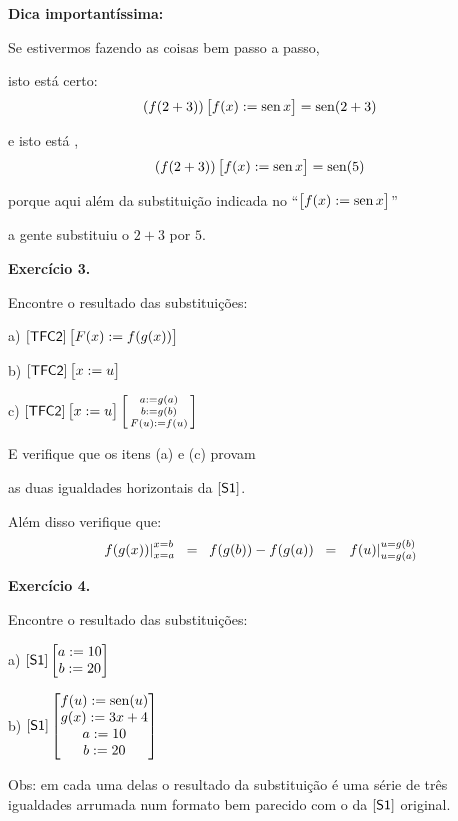 \documentclass[oneside,12pt]{article}
\begin{document}
{\bf Dica importantíssima:}

Se estivermos fazendo as coisas bem passo a passo,

isto está certo:
%
$$(f(2+3)) \Subst{f(x):=\sen x} = \sen(2+3)$$

e isto está ,
%
$$(f(2+3)) \Subst{f(x):=\sen x} = \sen(5)$$

porque aqui além da substituição indicada no ``$\Subst{f(x):=\sen
  x}$''

a gente substituiu o $2+3$ por $5$.



\newpage


{\bf Exercício 3.}

Encontre o resultado das substituições:

\msk

a) $\pfo{TFC2}\Subst{F(x) := f(g(x))}$

b) $\pfo{TFC2}\Subst{x:=u}$

c) $\pfo{TFC2}\Subst{x:=u}\subst{a:=g(a) \\ b:=g(b) \\ F(u):=f(u)\\}$

E verifique que os itens (a) e (c) provam

as duas igualdades horizontais da $\pfo{S1}$.

\msk

Além disso verifique que:
%
$$\Difmx{a}{b}{f(g(x))}
  \;\;=\;\; f(g(b)) - f(g(a))
  \;\;=\;\;
  \Difmu{g(a)}{g(b)}{f(u)}
$$

\newpage


{\bf Exercício 4.}

\ssk

Encontre o resultado das substituições:

\msk

a) $\pfo{S1} \Subst{a:=10 \\ b:=20}$

b) $\pfo{S1} \Subst{f(u) := \sen(u) \\ g(x) := 3x+4 \\ a:=10 \\ b:=20}$

\bsk

Obs: em cada uma delas o resultado da substituição é uma série de três
igualdades arrumada num formato bem parecido com o da $\pfo{S1}$
original.
\end{document}
